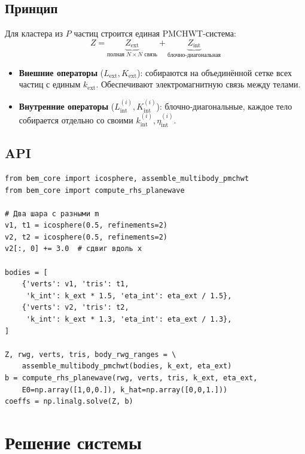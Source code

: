 \documentclass[12pt,a4paper]{article}
\begin{document}
\subsection{Принцип}

Для кластера из $P$ частиц строится единая PMCHWT-система:
\begin{equation}
Z = \underbrace{Z_{\mathrm{ext}}}_{\text{полная $N \times N$ связь}} + \underbrace{Z_{\mathrm{int}}}_{\text{блочно-диагональная}}
\end{equation}

\begin{itemize}
  \item \textbf{Внешние операторы} ($L_{\mathrm{ext}}, K_{\mathrm{ext}}$): собираются на объединённой сетке всех частиц с единым $k_{\mathrm{ext}}$. Обеспечивают электромагнитную связь между телами.
  \item \textbf{Внутренние операторы} ($L_{\mathrm{int}}^{(i)}, K_{\mathrm{int}}^{(i)}$): блочно-диагональные, каждое тело собирается отдельно со своими $k_{\mathrm{int}}^{(i)}, \eta_{\mathrm{int}}^{(i)}$.
\end{itemize}

\subsection{API}

\begin{lstlisting}
from bem_core import icosphere, assemble_multibody_pmchwt
from bem_core import compute_rhs_planewave

# Два шара с разными m
v1, t1 = icosphere(0.5, refinements=2)
v2, t2 = icosphere(0.5, refinements=2)
v2[:, 0] += 3.0  # сдвиг вдоль x

bodies = [
    {'verts': v1, 'tris': t1,
     'k_int': k_ext * 1.5, 'eta_int': eta_ext / 1.5},
    {'verts': v2, 'tris': t2,
     'k_int': k_ext * 1.3, 'eta_int': eta_ext / 1.3},
]

Z, rwg, verts, tris, body_rwg_ranges = \
    assemble_multibody_pmchwt(bodies, k_ext, eta_ext)
b = compute_rhs_planewave(rwg, verts, tris, k_ext, eta_ext,
    E0=np.array([1,0,0.]), k_hat=np.array([0,0,1.]))
coeffs = np.linalg.solve(Z, b)
\end{lstlisting}


\section{Решение системы}
\end{document}
